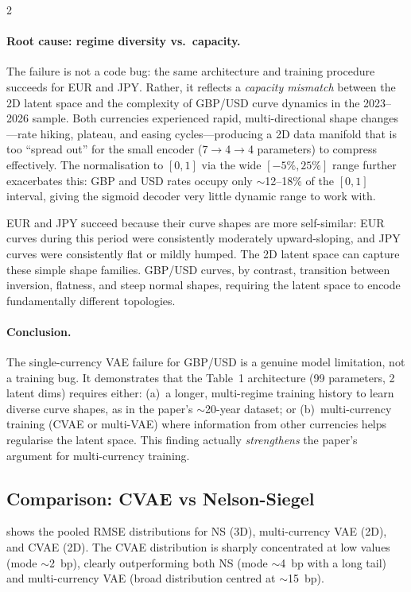 \documentclass[10pt,a4paper]{article}
\theoremstyle{plain}
\theoremstyle{definition}
\begin{document}
\begin{multicols}{2}
\paragraph{Root cause: regime diversity vs.\ capacity.} The failure is not a code bug: the same architecture and training procedure succeeds for EUR and JPY. Rather, it reflects a \textit{capacity mismatch} between the 2D latent space and the complexity of GBP/USD curve dynamics in the 2023--2026 sample. Both currencies experienced rapid, multi-directional shape changes---rate hiking, plateau, and easing cycles---producing a 2D data manifold that is too ``spread out'' for the small encoder (7$\to$4$\to$4 parameters) to compress effectively. The normalisation to $[0,1]$ via the wide $[-5\%, 25\%]$ range further exacerbates this: GBP and USD rates occupy only $\sim$12--18\% of the $[0,1]$ interval, giving the sigmoid decoder very little dynamic range to work with.

EUR and JPY succeed because their curve shapes are more self-similar: EUR curves during this period were consistently moderately upward-sloping, and JPY curves were consistently flat or mildly humped. The 2D latent space can capture these simple shape families. GBP/USD curves, by contrast, transition between inversion, flatness, and steep normal shapes, requiring the latent space to encode fundamentally different topologies.

\paragraph{Conclusion.} The single-currency VAE failure for GBP/USD is a genuine model limitation, not a training bug. It demonstrates that the Table~1 architecture (99 parameters, 2 latent dims) requires either: (a)~a longer, multi-regime training history to learn diverse curve shapes, as in the paper's $\sim$20-year dataset; or (b)~multi-currency training (CVAE or multi-VAE) where information from other currencies helps regularise the latent space. This finding actually \textit{strengthens} the paper's argument for multi-currency training.

\subsection{Comparison: CVAE vs Nelson-Siegel}\label{sec:cvae_vs_ns}

 shows the pooled RMSE distributions for NS (3D), multi-currency VAE (2D), and CVAE (2D). The CVAE distribution is sharply concentrated at low values (mode $\sim$2~bp), clearly outperforming both NS (mode $\sim$4~bp with a long tail) and multi-currency VAE (broad distribution centred at $\sim$15~bp).


\end{multicols}
\end{document}

